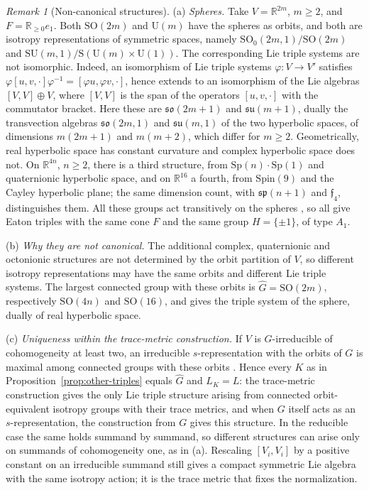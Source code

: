 \documentclass[11pt]{amsart}
\theoremstyle{plain}
\theoremstyle{definition}
\theoremstyle{remark}
\newtheorem{remark}[theorem]{Remark}
\newcommand{\R}{\mathbb R}
\begin{document}
\begin{remark}[Non-canonical structures]\label{rem:noncanonical-lie-triple}
(a) \emph{Spheres.} Take $V=\R^{2m}$, $m\ge2$, and $F=\R_{\ge0}e_1$. Both $\mathrm{SO}(2m)$ and $\mathrm{U}(m)$ have the spheres as orbits, and both are isotropy representations of symmetric spaces, namely $\mathrm{SO}_0(2m,1)/\mathrm{SO}(2m)$ and $\mathrm{SU}(m,1)/\mathrm{S}(\mathrm{U}(m)\times \mathrm{U}(1))$. The corresponding Lie triple systems are not isomorphic. Indeed, an isomorphism of Lie triple systems $\varphi:V\to V'$ satisfies $\varphi[u,v,\cdot]\varphi^{-1}=[\varphi u,\varphi v,\cdot]$, hence extends to an isomorphism of the Lie algebras $[V,V]\oplus V$, where $[V,V]$ is the span of the operators $[u,v,\cdot]$ with the commutator bracket. Here these are $\mathfrak{so}(2m+1)$ and $\mathfrak{su}(m+1)$, dually the transvection algebras $\mathfrak{so}(2m,1)$ and $\mathfrak{su}(m,1)$ of the two hyperbolic spaces, of dimensions $m(2m+1)$ and $m(m+2)$, which differ for $m\ge2$. Geometrically, real hyperbolic space has constant curvature and complex hyperbolic space does not. On $\R^{4n}$, $n\ge2$, there is a third structure, from $\mathrm{Sp}(n)\cdot \mathrm{Sp}(1)$ and quaternionic hyperbolic space, and on $\R^{16}$ a fourth, from $\mathrm{Spin}(9)$ and the Cayley hyperbolic plane; the same dimension count, with $\mathfrak{sp}(n+1)$ and $\mathfrak f_4$, distinguishes them. All these groups act transitively on the spheres \cite[Introduction]{EH2}, so all give Eaton triples with the same cone $F$ and the same group $H=\{\pm1\}$, of type $A_1$.

(b) \emph{Why they are not canonical.} The additional complex, quaternionic and octonionic structures are not determined by the orbit partition of $V$, so different isotropy representations may have the same orbits and different Lie triple systems. The largest connected group with these orbits is $\widehat G=\mathrm{SO}(2m)$, respectively $\mathrm{SO}(4n)$ and $\mathrm{SO}(16)$, and gives the triple system of the sphere, dually of real hyperbolic space.

(c) \emph{Uniqueness within the trace-metric construction.} If $V$ is $G$-irreducible of cohomogeneity at least two, an irreducible $s$-representation with the orbits of $G$ is maximal among connected groups with these orbits \cite[Proposition~5.1]{EH}. Hence every $K$ as in Proposition~\ref{prop:other-triples} equals $\widehat G$ and $L_K=L$: the trace-metric construction gives the only Lie triple structure arising from connected orbit-equivalent isotropy groups with their trace metrics, and when $G$ itself acts as an $s$-representation, the construction from $G$ gives this structure. In the reducible case the same holds summand by summand, so different structures can arise only on summands of cohomogeneity one, as in (a). Rescaling $[V_i,V_i]$ by a positive constant on an irreducible summand still gives a compact symmetric Lie algebra with the same isotropy action; it is the trace metric that fixes the normalization.
\end{remark}
\end{document}
